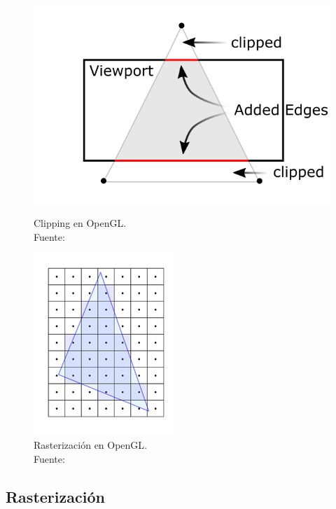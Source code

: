 \begin{figure}[h]
	\centering
	\begin{minipage}[b]{0.5\textwidth}
		\centering 
		\captionsetup{justification=centering}
		\includegraphics{figures/clipping.png}
		\caption[Clipping en OpenGL.]{Clipping en OpenGL. \\
		Fuente:~\cite{ClippingImage}}
		\label{fig2.3a}
	\end{minipage}\hfill
	\begin{minipage}[b]{0.5\textwidth}
		\centering 
		\captionsetup{justification=centering}
		\includegraphics{figures/rasterization.png}
		\caption[Rasterización en OpenGL.]{Rasterización en OpenGL. \\
		Fuente:~\cite{RasterizationImage}}
		\label{fig2.3b}
	\end{minipage}
\end{figure}

\subsection{Rasterización}
\label{ref:rasterizacion}

